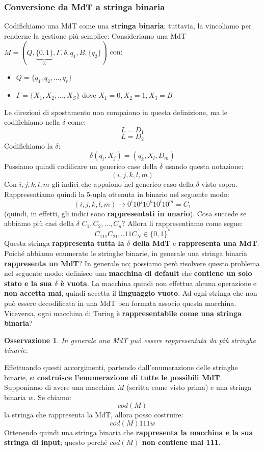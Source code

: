 \documentclass[12pt]{article}
\newtheorem{Osservazione}{Osservazione}[subsection]
\begin{document}
\subsubsection{Conversione da MdT a stringa binaria}
Codifichiamo una MdT come una \textbf{stringa binaria}: tuttavia, la vincoliamo per renderne la gestione più semplice: \newline
Consideriamo una MdT $M = (Q, \underbrace{\{0, 1\}}_\Sigma, \Gamma, \delta, q_1, B, \{q_2\})$ \newline
con:
\begin{itemize}
    \item $Q = \{q_1, q_2, ..., q_r\}$
    \item $\Gamma = \{X_1, X_2, ..., X_S\}$ dove $X_1 = 0, X_2 = 1, X_3 = B$
\end{itemize}
Le direzioni di spostamento non compaiono in questa definizione, ma le codifichiamo nella $\delta$ come:
$$L = D_1$$
$$L = D_2$$
Codifichiamo la $\delta$:
$$\delta(q_i, X_j) = (q_k, X_l, D_m)$$
Possiamo quindi codificare un generico case della $\delta$ usando questa notazione:
$$(i, j, k, l, m)$$
Con $i, j, k, l, m$ gli indici che appaiono nel generico caso della $\delta$ visto sopra. Rappresentiamo quindi la $5$-upla ottenuta in binario nel seguente modo:
$$(i, j, k, l, m) \rightarrow 0^i10^j10^k10^l10^m = C_1$$
(quindi, in effetti, gli indici sono \textbf{rappresentati in unario}). Cosa succede se abbiamo più casi della $\delta$ $C_1, C_2, ..., C_n$? Allora li rappresentiamo come segue:
$$C_111C_211..11C_N \in \{0, 1\}^*$$
Questa stringa \textbf{rappresenta tutta la $\delta$ della MdT} e \textbf{rappresenta una MdT}. Poiché abbiamo enumerato le stringhe binarie, in generale una stringa binaria \textbf{rappresenta un MdT}? In generale no; possiamo però risolvere questo problema nel seguente modo:
definisco una \textbf{macchina di default} che \textbf{contiene un solo stato e la sua $\delta$ è vuota}. La macchina quindi non effettua alcuna operazione e \textbf{non accetta mai}, quindi accetta il \textbf{linguaggio vuoto}. Ad ogni stringa che non può essere decodificata in una MdT ben formata associo questa macchina. \newline
Viceversa, ogni macchina di Turing è \textbf{rappresentabile come una stringa binaria}?
\begin{Osservazione}
    In generale una MdT può essere rappresentata da più stringhe binarie.
\end{Osservazione}
Effettuando questi accorgimenti, partendo dall'enumerazione delle stringhe binarie, si \textbf{costruisce l'enumerazione di tutte le possibili MdT}. \newline
Supponiamo di avere una macchina $M$ (scritta come visto prima) e una stringa binaria $w$. Se chiamo:
$$cod(M)$$
la stringa che rappresenta la MdT, allora posso costruire:
$$cod(M)111w$$
Ottenendo quindi una stringa binaria che \textbf{rappresenta la macchina e la sua stringa di input}; questo perché \textbf{$cod(M)$ non contiene mai 111}.
\end{document}
